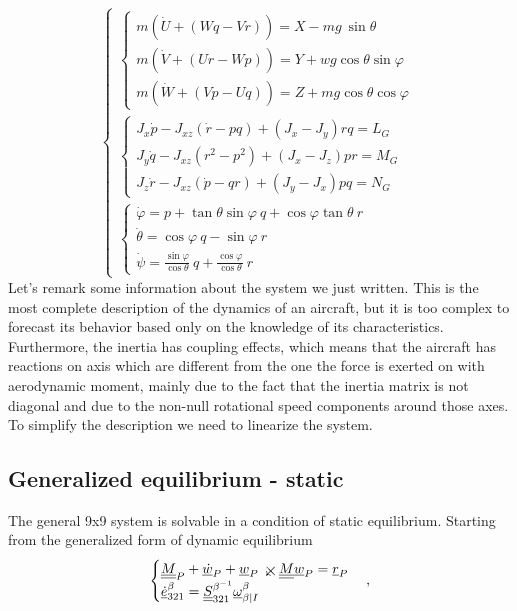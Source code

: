 \begin{equation}
    \begin{cases}
        \begin{cases}
            m(\dot U + (Wq-Vr)) = X - mg~\sin\theta\\
            m(\dot V + (Ur-Wp)) = Y + wg \cos\theta \sin\varphi\\
            m(\dot W + (Vp -Uq)) = Z + mg\cos\theta \cos\varphi
        \end{cases}\\
        \begin{cases}
            J_x \dot p - J_{xz}(\dot r - pq) + (J_x - J_y) rq  = L_G\\
            J_y \dot q - J_{xz}(r^2 - p^2) + (J_x - J_z) pr  = M_G\\
            J_z \dot r - J_{xz}(\dot p - qr) + (J_y - J_x) pq  = N_G
        \end{cases}\\
        \begin{cases}
        \dot \varphi = p + \tan\theta \sin\varphi ~q + \cos\varphi\tan\theta ~r\\
        \dot \theta =  \cos \varphi~q - \sin\varphi ~r\\
        \dot \psi = \frac{\sin\varphi}{\cos\theta}~q + \frac{\cos\varphi}{\cos\theta}~r
    \end{cases}
    \end{cases}
\end{equation}
Let's remark some information about the system we just written. This is the most complete description of the dynamics of an aircraft, but it is too complex to forecast its behavior based only on the knowledge of its characteristics. Furthermore, the inertia has coupling effects, which means that the aircraft has reactions on axis which are different from the one the force is exerted on with aerodynamic moment, mainly due to the fact that the inertia matrix is not diagonal and due to the non-null rotational speed components around those axes.
To simplify the description we need to linearize the system.

\subsection{Generalized equilibrium - static}
The general 9x9 system is solvable in a condition of static equilibrium.
Starting from the generalized form of dynamic equilibrium
\begin{equation}
\label{eq: generalized form of dynamic equilibrium}
    \begin{cases}
        \underline{\underline{M}}_P+\underline{\dot w}_P+\underline{w}_P\swcross\underline{\underline{M}}\underline{w}_P=\underline{r}_P\\
        \underline{\dot e}_{321}^\beta = \underline{\underline{S}}_{321}^{ \beta^{-1}}\underline{\omega}_{\beta|I}^\beta
    \end{cases},
\end{equation}

